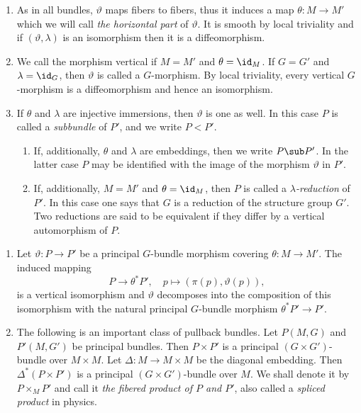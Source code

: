 \begin{rem}\label{rem 1.1.8 RS2}
    \begin{enumerate}
        \item As in all bundles, $\vartheta$ maps fibers to fibers, thus it induces a map $\theta:M\to M'$ which we will call \emph{the horizontal part} of $\vartheta$. It is smooth by local triviality and if $(\vartheta,\lambda)$ is an isomorphism then it is a diffeomorphism.
        \item We call the morphism vertical if $M=M'$ and $\theta=\id_M$. If $G=G'$ and $\lambda=\id_G$, then $\vartheta$ is called a $G$-morphism. By local triviality, every vertical $G$-morphism is a diffeomorphism and hence an isomorphism.
        \item If $\theta$ and $\lambda$ are injective immersions, then $\vartheta$ is one as well. In this case $P$ is called a \emph{subbundle} of $P'$, and we write $P<P'$.
        \begin{enumerate}
            \item If, additionally, $\theta$ and $\lambda$ are embeddings, then we write $P\sub P'$. In the latter case $P$ may be identified with the image of the morphism $\vartheta$ in $P'$.
            \item If, additionally, $M=M'$ and $\theta=\id_M$, then $P$ is called a \emph{$\lambda$-reduction} of $P'$. In this case one says that $G$ is a reduction of the structure group $G'$. Two reductions are said to be equivalent  if they differ by a vertical automorphism of $P$.
        \end{enumerate}
    \end{enumerate}
\end{rem}

\begin{rem}\label{rem 1.1.9 RS2}
    \begin{enumerate}
        \item Let $\vartheta:P\to P'$ be a principal $G$-bundle morphism covering $\theta:M\to M'$. The induced mapping
        \[P\to \theta^\ast P',\quad p\mapsto (\pi(p),\vartheta(p)),\]
        is a vertical isomorphism and $\vartheta$ decomposes into the composition of this isomorphism with the natural principal $G$-bundle morphism $\theta^\ast P'\to P'$.
        \item The following is an important class of pullback bundles. Let $P(M,G)$ and $P'(M,G')$ be principal bundles. Then $P\times P'$ is a principal $(G\times G')$-bundle over $M\times M$. Let $\Delta:M\to M\times M$ be the diagonal embedding. Then $\Delta^\ast(P\times P')$ is a principal $(G\times G')$-bundle over $M$. We shall denote it by $P\times_M P'$ and call it \emph{the fibered product of $P$ and $P'$}, also called a \emph{spliced product} in physics.
    \end{enumerate}
\end{rem}









